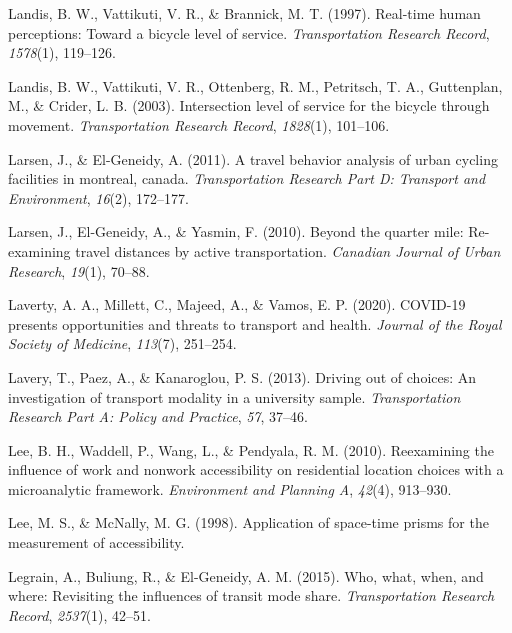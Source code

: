 \documentclass[12pt,twoside]{reedthesis}
\newlength{\cslhangindent}
\newenvironment{CSLReferences}[2] %
 {%
  \setlength{\parindent}{0pt}
  \ifodd #1 \everypar{\setlength{\hangindent}{\cslhangindent}}\ignorespaces\fi
  \ifnum #2 > 0
  \setlength{\parskip}{#2\baselineskip}
  \fi
 }%
 {}
\begin{document}
\begin{CSLReferences}{1}{0}
\leavevmode{}%
Landis, B. W., Vattikuti, V. R., \& Brannick, M. T. (1997). Real-time human perceptions: Toward a bicycle level of service. \emph{Transportation Research Record}, \emph{1578}(1), 119--126.

\leavevmode{}%
Landis, B. W., Vattikuti, V. R., Ottenberg, R. M., Petritsch, T. A., Guttenplan, M., \& Crider, L. B. (2003). Intersection level of service for the bicycle through movement. \emph{Transportation Research Record}, \emph{1828}(1), 101--106.

\leavevmode{}%
Larsen, J., \& El-Geneidy, A. (2011). A travel behavior analysis of urban cycling facilities in montreal, canada. \emph{Transportation Research Part D: Transport and Environment}, \emph{16}(2), 172--177.

\leavevmode{}%
Larsen, J., El-Geneidy, A., \& Yasmin, F. (2010). Beyond the quarter mile: Re-examining travel distances by active transportation. \emph{Canadian Journal of Urban Research}, \emph{19}(1), 70--88.

\leavevmode{}%
Laverty, A. A., Millett, C., Majeed, A., \& Vamos, E. P. (2020). COVID-19 presents opportunities and threats to transport and health. \emph{Journal of the Royal Society of Medicine}, \emph{113}(7), 251--254.

\leavevmode{}%
Lavery, T., Paez, A., \& Kanaroglou, P. S. (2013). Driving out of choices: An investigation of transport modality in a university sample. \emph{Transportation Research Part A: Policy and Practice}, \emph{57}, 37--46.

\leavevmode{}%
Lee, B. H., Waddell, P., Wang, L., \& Pendyala, R. M. (2010). Reexamining the influence of work and nonwork accessibility on residential location choices with a microanalytic framework. \emph{Environment and Planning A}, \emph{42}(4), 913--930.

\leavevmode{}%
Lee, M. S., \& McNally, M. G. (1998). Application of space-time prisms for the measurement of accessibility.

\leavevmode{}%
Legrain, A., Buliung, R., \& El-Geneidy, A. M. (2015). Who, what, when, and where: Revisiting the influences of transit mode share. \emph{Transportation Research Record}, \emph{2537}(1), 42--51.


\end{CSLReferences}
\end{document}
